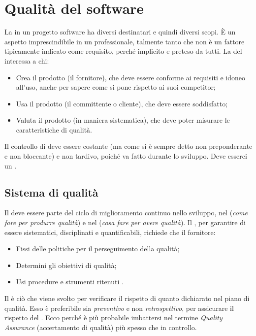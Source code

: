 \documentclass[../main]{subfiles}
\begin{document}
\section{Qualità del software}
La  in un progetto software ha diversi destinatari e quindi diversi scopi. È un aspetto imprescindibile in un  professionale, talmente tanto che non è un fattore tipicamente indicato come requisito, perché implicito e preteso da tutti. La  del  interessa a chi:
\begin{itemize}
    \item Crea il prodotto (il fornitore), che deve essere conforme ai requisiti e idoneo all'uso, anche per sapere come si pone rispetto ai suoi competitor;
    \item Usa il prodotto (il committente o cliente), che deve essere soddisfatto;
    \item Valuta il prodotto (in maniera sistematica), che deve poter misurare le caratteristiche di qualità.
\end{itemize}
Il controllo di  deve essere costante (ma come si è sempre detto non preponderante e non bloccante) e non tardivo, poiché va fatto durante lo sviluppo. Deve esserci un .
\subsection{Sistema di qualità}
Il  deve essere parte del ciclo di miglioramento continuo nello sviluppo, nel  (\textit{come fare per produrre qualità}) e nel  (\textit{cosa fare per avere qualità}).
Il , per garantire di essere sistematici, disciplinati e quantificabili, richiede che il fornitore:
\begin{itemize}
    \item Fissi delle politiche per il perseguimento della qualità;
    \item Determini gli obiettivi di qualità;
    \item Usi procedure e strumenti ritenuti .
\end{itemize}
Il  è ciò che viene svolto per verificare il rispetto di quanto dichiarato nel piano di qualità. Esso è preferibile sia \textit{preventivo} e non \textit{retrospettivo}, per assicurare il rispetto del . Ecco perché è più probabile imbattersi nel termine \textit{Quality Assurance} (accertamento di qualità) più spesso che in controllo.
\end{document}

